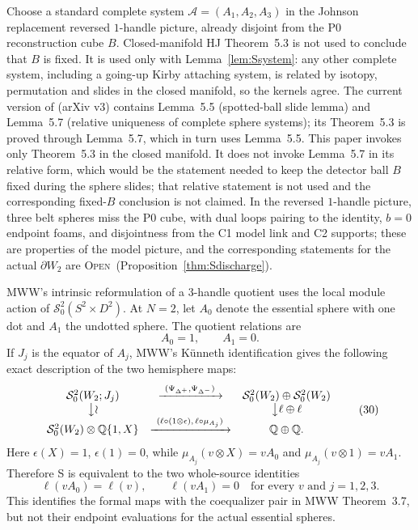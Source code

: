 \documentclass[11pt]{amsart}
\theoremstyle{definition}
\theoremstyle{remark}
\newcommand{\Q}{\mathbb{Q}}
\newcommand{\Open}{\textnormal{\textsc{Open}}}
\begin{document}
Choose a standard complete system
\(\mathcal A=(A_1,A_2,A_3)\) in the Johnson replacement reversed
$1$-handle picture, already disjoint from the P0 reconstruction cube $B$.
Closed-manifold HJ Theorem~5.3 is not used to conclude that $B$ is fixed.
It is used only with Lemma~\ref{lem:Ssystem}: any other complete system,
including a going-up Kirby attaching system, is related by isotopy,
permutation and slides in the closed manifold, so the kernels agree.
The current version of \cite{HorvatJablonowski2025} (arXiv v3) contains
Lemma~5.5 (spotted-ball slide lemma) and Lemma~5.7 (relative uniqueness of
complete sphere systems); its Theorem~5.3 is proved through Lemma~5.7,
which in turn uses Lemma~5.5.  This paper invokes only Theorem~5.3 in the
closed manifold.  It does not invoke Lemma~5.7 in its relative form, which
would be the statement needed to keep the detector ball $B$ fixed during
the sphere slides; that relative statement is not used and the
corresponding fixed-$B$ conclusion is not claimed.
In the reversed $1$-handle picture, three belt spheres miss the P0 cube,
with dual loops pairing to the identity, $b=0$ endpoint foams, and
disjointness from the C1 model link and C2 supports; these are properties
of the model picture, and the corresponding statements for the actual
$\partial W_2$ are \Open\ (Proposition~\ref{thm:Sdischarge}).

MWW's intrinsic reformulation of a $3$-handle quotient uses the local module
action of $\mathcal S^2_0(S^2\times D^2)$.  At $N=2$, let $A_0$ denote the
essential sphere with one dot and $A_1$ the undotted sphere.  The quotient
relations are
\[
A_0=1,\qquad A_1=0.
\]
If $J_j$ is the equator of $A_j$, MWW's K\"unneth identification gives the
following exact description of the two hemisphere maps:
\[
\begin{array}{ccc}
\mathcal S^2_0(W_2;J_j)&\xrightarrow{\ (\Psi_{\Delta^+},\Psi_{\Delta^-})\ }&
\mathcal S^2_0(W_2)\oplus\mathcal S^2_0(W_2)\\
\big\downarrow\wr&&\big\downarrow{\ell\oplus\ell}\\
\mathcal S^2_0(W_2)\otimes\Q\{1,X\}
&\xrightarrow{\ (\ell\circ(1\otimes\epsilon),\,\ell\circ\mu_{A_j})\ }&
\Q\oplus\Q.
\end{array}
\tag{30}
\]
Here $\epsilon(X)=1$, $\epsilon(1)=0$, while
$\mu_{A_j}(v\otimes X)=vA_0$ and
$\mu_{A_j}(v\otimes1)=vA_1$.  Therefore S is equivalent to the two
whole-source identities
\[
\ell(vA_0)=\ell(v),\qquad \ell(vA_1)=0
\quad\text{for every }v\text{ and }j=1,2,3.
\tag{31}
\]
This identifies the formal maps with the coequalizer pair in MWW
Theorem~3.7, but not their endpoint evaluations for the actual essential
spheres.
\end{document}
